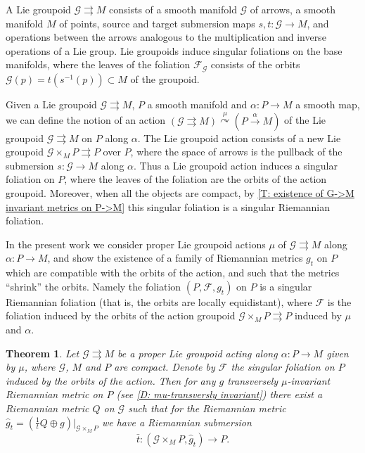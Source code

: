 \documentclass[12pt,a4paper,reqno]{amsart}
\newcommand{\1}{\mathbbm{1}} %
\newcommand{\fol}{\mathcal{F}} %
\newcommand{\G}{\mathcal{G}} %
\newtheorem{theorem}{Theorem}
\theoremstyle{definition}
\theoremstyle{TheoremNum}
\begin{document}
A Lie groupoid $\G\rightrightarrows M$  consists of a smooth manifold $\G$ of arrows,  a smooth manifold $M$ of points, source and target submersion maps $s,t\colon \G\to M$, and operations between the arrows analogous to the multiplication and inverse operations of a Lie group. Lie groupoids induce singular foliations on the base manifolds, where the leaves of the foliation $\fol_\G$ consists of the orbits $\G(p) = t(s^{-1}(p))\subset M$ of the groupoid.

Given a Lie groupoid $\G\rightrightarrows M$, $P$ a smooth manifold and $\alpha\colon P\to M$ a smooth map, we can define the notion of an action $(\G\rightrightarrows M)\overset{\mu}{\curvearrowright} (P\overset{\alpha}{\to} M)$ of the Lie groupoid $\G\rightrightarrows M$ on $P$ along $\alpha$. The Lie groupoid action consists of a new Lie groupoid $\G\times_M P\rightrightarrows P$ over $P$, where the space of arrows is the pullback of the submersion $s\colon \G\to M$ along $\alpha$. Thus a Lie groupoid action induces a singular foliation on $P$, where the leaves of the foliation are the orbits of the action groupoid. Moreover, when all the objects are compact, by \th\ref{T: existence of G->M invariant metrics on P->M} this singular foliation is a singular Riemannian foliation. 

In the present work we consider  proper Lie groupoid actions $\mu$ of $\G\rightrightarrows M$ along $\alpha\colon P\to M$, and show the existence of a family of Riemannian metrics $g_t$ on $P$ which are compatible with the orbits of the action, and such that the metrics ``shrink'' the orbits. Namely the foliation $(P,\fol,g_t)$ on $P$ is a singular Riemannian foliation (that is, the orbits are locally equidistant), where $\fol$ is the foliation induced by the orbits of the  action groupoid $\G\times_M P\rightrightarrows P$ induced by $\mu $ and $\alpha$.

\begin{theorem}\th\label{MT: deformation}
Let $\G\rightrightarrows M$ be a proper Lie groupoid acting along $\alpha\colon P\to M$ given by $\mu$, where $\G$, $M$ and $P$ are compact. Denote by $\fol$ the singular foliation on $P$ induced by the orbits of the action. Then for any $g$ transversely $\mu$-invariant Riemannian metric on $P$ (see \th\ref{D: mu-transversly invariant}) there exist a Riemannian metric $Q$ on $\G$ such that for the Riemannian metric $\widehat{g}_t = (\frac{1}{t}Q\oplus g)|_{\G\times_M P}$ we have a Riemannian submersion
\[
\bar{t}\colon (\G\times_M P,\widehat{g}_t)\to P.
\]
\end{theorem}
\end{document}
